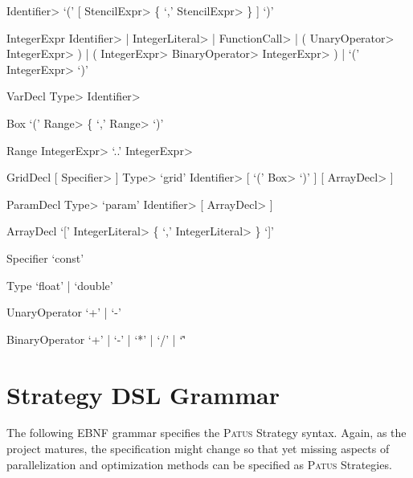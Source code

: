 \begin{EBNF}
		\<Identifier> `(' [ \<StencilExpr> \{ `,' \<StencilExpr> \} ] `)'
	\item[IntegerExpr]
		\<Identifier> | \<IntegerLiteral> | \<FunctionCall> | ( \<UnaryOperator> \<IntegerExpr> ) | ( \<IntegerExpr> \<BinaryOperator> \<IntegerExpr> ) | `(' \<IntegerExpr> `)'
	\item[VarDecl]
		\<Type> \<Identifier>
	\item[Box]
		`(' \<Range> \{ `,' \<Range> `)'
	\item[Range]
		\<IntegerExpr> `..' \<IntegerExpr>
	\item[GridDecl]
		[ \<Specifier> ] \<Type> `grid' \<Identifier> [ `(' \<Box> `)' ] [ \<ArrayDecl> ]
	\item[ParamDecl]
		\<Type> `param' \<Identifier> [ \<ArrayDecl> ]
	\item[ArrayDecl]
		`[' \<IntegerLiteral> \{ `,' \<IntegerLiteral> \} `]'
	\item[Specifier]
		`const'
	\item[Type]
		`float' | `double'
	\item[UnaryOperator]
		`+' | `-'
	\item[BinaryOperator]
		`+' | `-' | `*' | `/' | `\^'
\end{EBNF}



\section{Strategy DSL Grammar}

The following EBNF grammar specifies the \textsc{Patus} Strategy syntax.
Again, as the project matures, the specification might change so that yet missing aspects of parallelization and
optimization methods can be specified as \textsc{Patus} Strategies.

